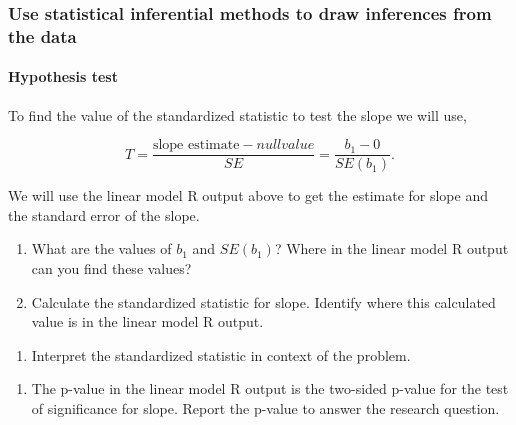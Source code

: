 \documentclass[
]{report}
\providecommand{\tightlist}{%
  \setlength{\itemsep}{0pt}\setlength{\parskip}{0pt}}
\begin{document}
\hypertarget{use-statistical-inferential-methods-to-draw-inferences-from-the-data-7}{%
\subsubsection*{Use statistical inferential methods to draw inferences from the data}\label{use-statistical-inferential-methods-to-draw-inferences-from-the-data-7}}

\hypertarget{hypothesis-test-4}{%
\paragraph*{Hypothesis test}\label{hypothesis-test-4}}

To find the value of the standardized statistic to test the slope we will use,

\[
T = \frac{\mbox{slope estimate}-null value}{SE} = \frac{b_1-0}{SE(b_1)}.
\]

We will use the linear model R output above to get the estimate for slope and the standard error of the slope.

\begin{enumerate}
\def\labelenumi{\arabic{enumi}.}
\setcounter{enumi}{6}
\item
  What are the values of \(b_1\) and \(SE(b_1)\)? Where in the linear model R output can you find these values?
  \vspace{0.5in}
\item
  Calculate the standardized statistic for slope. Identify where this calculated value is in the linear model R output.
\end{enumerate}

\vspace{0.7in}

\begin{enumerate}
\def\labelenumi{\arabic{enumi}.}
\setcounter{enumi}{8}
\tightlist
\item
  Interpret the standardized statistic in context of the problem.
\end{enumerate}

\vspace{0.8in}

\begin{enumerate}
\def\labelenumi{\arabic{enumi}.}
\setcounter{enumi}{9}
\tightlist
\item
  The p-value in the linear model R output is the two-sided p-value for the test of significance for slope. Report the p-value to answer the research question.
\end{enumerate}
\end{document}
